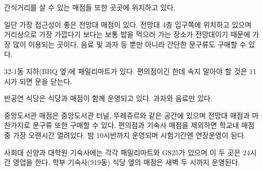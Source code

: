 \starbreak 간식거리를 살 수 있는 매점들 또한 곳곳에 위치하고 있다.
\begin{packed_item}
\item 일단 가장 접근성이 좋은 전망대 매점이 있다. 전망대 4층 입구쪽에 위치하고
  있으며 거리상으로 가장 가깝다기 보다는 보통 밥을 먹으러 가는 장소가 전망대이기
  때문에 가장 많이 이용되는 곳이다. 음료 및 과자 등 뿐만 아니라 간단한 문구류도
  구매할 수 있다.
\item 32-1동 지하(BBQ 옆)에 패밀리마트가 있다. 편의점이긴 한데 속지 말아야 할
  것은 11시가 되면 문을 닫는다.
\item 반공연 식당은 식당과 매점이 함께 운영되고 있다. 과자와 음료만 있다.
\item 중앙도서관 매점은 중앙도서관 터널, 뚜레쥬르와 같은 공간에 있으며 전망대
  매점과 마찬가지로 문구류 또한 구매할 수 있다. 편의점과 기숙사 매점을 제외하면
  학교내 매점 중 가장 오랜시간 열려있다. 밤 10시반까지 운영되며 시험기간엔
  연장운영이 된다.
\item 사회대 신양과 대학원 기숙사에는 각각 패밀리마트와 GS25가 있으며 이 두 곳은
  24시간 영업을 한다. 학부 기숙사(919동) 식당 옆의 매점은 새벽 두 시까지
  운영된다.
\end{packed_item}

